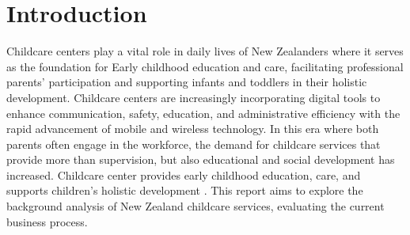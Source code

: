 \section{Introduction}
\par
Childcare centers play a vital role in daily lives of New Zealanders where it serves as the foundation for Early childhood education and care, facilitating professional parents' participation and supporting infants and toddlers in their holistic development. Childcare centers are increasingly incorporating digital tools to enhance communication, safety, education, and administrative efficiency with the rapid advancement of mobile and wireless technology. In this era where both parents often engage in the workforce, the demand for childcare services that provide more than supervision, but also educational and social development has increased. Childcare center provides early childhood education, care, and supports children’s holistic development \cite{duhn2014making}. This report aims to explore the background analysis of New Zealand childcare services, evaluating the current business process.
